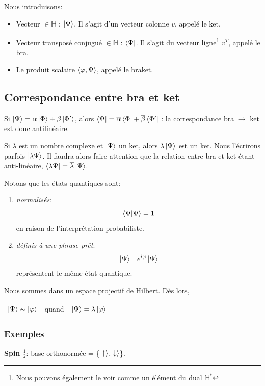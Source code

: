 \documentclass[../notesdecours.tex]{subfiles}
\begin{document}
Nous introduisons:
\begin{itemize}
\item Vecteur $\in \mathbb{H}$ : $\ket{\Psi}$. Il s'agit d'un vecteur colonne $v$, appelé le ket.
\item Vecteur transposé conjugué $\in \mathbb{H}$ : $\bra{\Psi}$. Il s'agit du vecteur ligne\footnote{Nous pouvons également le voir comme un élément du dual $\mathbb{H}^*$} $\overline{v}^T$, appelé le bra.
\item Le produit scalaire $\braket{\varphi,\Psi}$, appelé le braket.
\end{itemize}
\subsection{Correspondance entre bra et ket}
Si $\ket{\Psi} = \alpha \ket{\Phi} + \beta\ket{\Phi'}$, alors $\bra{\Psi} = \overline{\alpha}\bra{\Phi}+\overline{\beta}\bra{\Phi'}$ : la correspondance bra $\rightarrow$ ket est donc antilinéaire. 
\begin{remark} Si $\lambda$ est un nombre complexe et $\ket{\Psi}$ un ket, alors $\lambda\ket{\Psi}$ est un ket. Nous l'écrirons parfois $\ket{\lambda\Psi}$. Il faudra alors faire attention que la relation entre bra et ket étant anti-linéaire, $\bra{\lambda\Psi} = \overline{\lambda}\ket{\Psi}$. \end{remark}

Notons que les états quantiques sont:
\begin{enumerate}
\item \emph{normalisés}:
\begin{equation}
\braket{\Psi|\Psi} = 1
\end{equation}
en raison de l'interprétation probabiliste.
\item \emph{définis à une phrase prêt}:
\begin{align}
&\ket{\Psi} 	&e^{i\varphi}\ket{\Psi}
\end{align}
représentent le même état quantique.
\end{enumerate}
Nous sommes dans un espace projectif de Hilbert. Dès lors,

\begin{center}
\begin{tabular}{ c c c } 
$\ket{\Psi} \thicksim \ket{\varphi}$ & quand & $\ket{\Psi} = \lambda\ket{\varphi}$  
\end{tabular}
\end{center}

\subsubsection{Exemples}
\textbf{Spin $\frac{1}{2}$}: base orthonormée = \bigg\{$\ket{\uparrow}$,$\ket{\downarrow}$\bigg\}.\\
\end{document}
